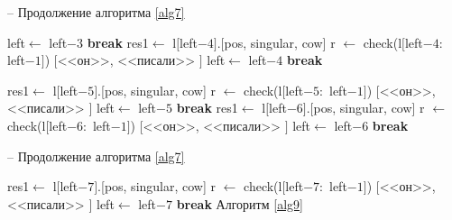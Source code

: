 \documentclass[main]{subfiles}
\begin{document}
\begin{algorithm}[!h]
	\caption{-- Продолжение алгоритма \ref{alg7}}\label{alg8}
	\begin{algorithmic}[1]
		\State left$\gets$ left$-3$
		\State \textbf{break}
		\EndIf
		\EndIf
		\EndFor
		\State  res1$\gets$ l$[$left$-4]$.[pos, singular, cow]
		\State r $\gets$ check(l$[$left$-4:$ left$-1 ]$)
		\State \Return $[$<<он>>, <<писали>> $]$
		\State left$\gets$ left$-4$
		\State \textbf{break}
		
			\EndIf
		\EndIf
			\EndFor
		\State  res1$\gets$ l$[$left$-5]$.[pos, singular, cow]
			\State r $\gets$ check(l$[$left$-5:$ left$-1 ]$)
			\State \Return $[$<<он>>, <<писали>> $]$
			\State left$\gets$ left$-5$
		\State \textbf{break}
		\EndIf
			\EndIf
		\EndFor
		\State  res1$\gets$ l$[$left$-6]$.[pos, singular, cow]
		\State r $\gets$ check(l$[$left$-6:$ left$-1 ]$)
		\State \Return $[$<<он>>, <<писали>> $]$
		\State left$\gets$ left$-6$
		\State \textbf{break}
		\EndIf
		\EndIf
		\EndFor
{}
	\end{algorithmic}
\end{algorithm}

\begin{algorithm}[!h]
	\caption{-- Продолжение алгоритма \ref{alg7}}\label{alg32}
	\begin{algorithmic}[1]
		\State  res1$\gets$ l$[$left$-7]$.[pos, singular, cow]
		\State r $\gets$ check(l$[$left$-7:$ left$-1 ]$)
		\State \Return $[$<<он>>, <<писали>> $]$
		\State left$\gets$ left$-7$
		\State \textbf{break}
		\EndIf
		\EndIf
		\EndFor
		\Else \State Алгоритм \ref{alg9}
		\EndIf
		\EndWhile
	\end{algorithmic}
\end{algorithm}
\end{document}
